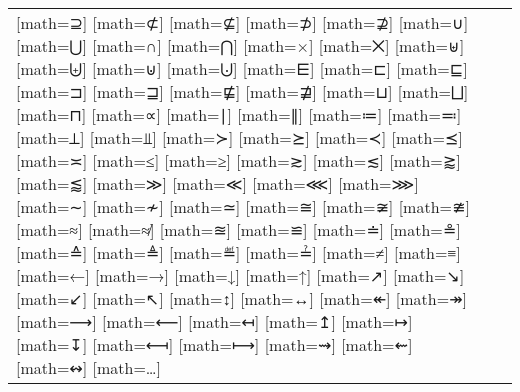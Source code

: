 \documentclass{unittest}
\begin{document}
\begin{tabular}{lcc}
\makerow{⊇}[math=⊇]
\makerow{⊄}[math=⊄]
\makerow{⊈}[math=⊈]
\makerow{⊅}[math=⊅]
\makerow{⊉}[math=⊉]
\makerow{∪}[math=∪]
\makerow{⋃}[math=⋃]
\makerow{∩}[math=∩]
\makerow{⋂}[math=⋂]
\makerow{×}[math=×]
\makerow{⨉}[math=⨉]
\midrule%
\makerow{⊎}[math=⊎]
\makerow{⨄}[math=⨄]
\makerow{⊍}[math=⊍]
\makerow{⨃}[math=⨃]
\makerow{⋿}[math=⋿]
\makerow{⊏}[math=⊏]
\makerow{⊑}[math=⊑]
\makerow{⊐}[math=⊐]
\makerow{⊒}[math=⊒]
\makerow{⋢}[math=⋢]
\makerow{⋣}[math=⋣]
\makerow{⊔}[math=⊔]
\makerow{⨆}[math=⨆]
\makerow{⊓}[math=⊓]
\midrule%
\makerow{∝}[math=∝]
\makerow{∣}[math=∣]
\makerow{∥}[math=∥]
\makerow{≔}[math=≔]
\makerow{≕}[math=≕]
\makerow{⟂}[math=⟂]
\makerow{⫫}[math=⫫]
\midrule%
\makerow{≻}[math=≻]
\makerow{⪰}[math=⪰]
\makerow{≺}[math=≺]
\makerow{⪯}[math=⪯]
\makerow{≍}[math=≍]
\makerow{≤}[math=≤]
\makerow{≥}[math=≥]
\makerow{≳}[math=≳]
\makerow{≲}[math=≲]
\makerow{⪆}[math=⪆]
\makerow{⪅}[math=⪅]
\makerow{≫}[math=≫]
\makerow{≪}[math=≪]
\makerow{⋘}[math=⋘]
\makerow{⋙}[math=⋙]
\midrule%
\makerow{∼}[math=∼]
\makerow{≁}[math=≁]
\makerow{≃}[math=≃]
\makerow{≅}[math=≅]
\makerow{≆}[math=≆]
\makerow{≇}[math=≇]
\makerow{≈}[math=≈]
\makerow{≉}[math=≉]
\makerow{≊}[math=≊]
\makerow{≌}[math=≌]
\makerow{≐}[math=≐]
\makerow{≗}[math=≗]
\makerow{≙}[math=≙]
\makerow{≜}[math=≜]
\makerow{≝}[math=≝]
\makerow{≟}[math=≟]
\makerow{≠}[math=≠]
\makerow{≡}[math=≡]
\midrule%
\makerow{←}[math=←]
\makerow{→}[math=→]
\makerow{↓}[math=↓]
\makerow{↑}[math=↑]
\makerow{↗}[math=↗]
\makerow{↘}[math=↘]
\makerow{↙}[math=↙]
\makerow{↖}[math=↖]
\makerow{↕}[math=↕]
\makerow{↔}[math=↔]
\makerow{↞}[math=↞]
\makerow{↠}[math=↠]
\makerow{⟶}[math=⟶]
\makerow{⟵}[math=⟵]
\midrule%
\makerow{↤}[math=↤]
\makerow{↥}[math=↥]
\makerow{↦}[math=↦]
\makerow{↧}[math=↧]
\makerow{⟻}[math=⟻]
\makerow{⟼}[math=⟼]
\midrule%
\makerow{⇝}[math=⇝]
\makerow{⇜}[math=⇜]
\makerow{↭}[math=↭]
\midrule%
\makerow{…}[math=…]

\end{tabular}
\end{document}
